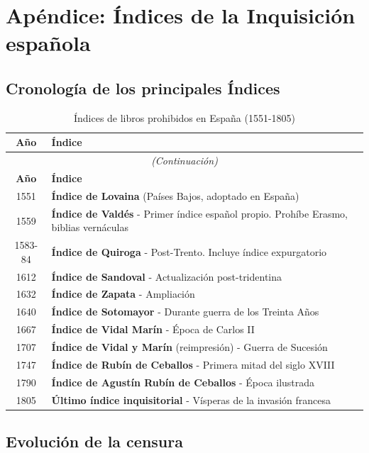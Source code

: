 \documentclass[12pt,a4paper]{article}
\begin{document}
\section{Apéndice: Índices de la Inquisición española}

\subsection{Cronología de los principales Índices}

\begin{longtable}{cp{10cm}}
\caption{Índices de libros prohibidos en España (1551-1805)} \\
\toprule
\textbf{Año} & \textbf{Índice} \\
\midrule
\endfirsthead
\multicolumn{2}{c}{\textit{(Continuación)}} \\
\toprule
\textbf{Año} & \textbf{Índice} \\
\midrule
\endhead
\bottomrule
\endfoot

1551 & \textbf{Índice de Lovaina} (Países Bajos, adoptado en España) \\
1559 & \textbf{Índice de Valdés} - Primer índice español propio. Prohíbe Erasmo, biblias vernáculas \\
1583-84 & \textbf{Índice de Quiroga} - Post-Trento. Incluye índice expurgatorio \\
1612 & \textbf{Índice de Sandoval} - Actualización post-tridentina \\
1632 & \textbf{Índice de Zapata} - Ampliación \\
1640 & \textbf{Índice de Sotomayor} - Durante guerra de los Treinta Años \\
1667 & \textbf{Índice de Vidal Marín} - Época de Carlos II \\
1707 & \textbf{Índice de Vidal y Marín} (reimpresión) - Guerra de Sucesión \\
1747 & \textbf{Índice de Rubín de Ceballos} - Primera mitad del siglo XVIII \\
1790 & \textbf{Índice de Agustín Rubín de Ceballos} - Época ilustrada \\
1805 & \textbf{Último índice inquisitorial} - Vísperas de la invasión francesa \\

\end{longtable}

\subsection{Evolución de la censura}
\end{document}
